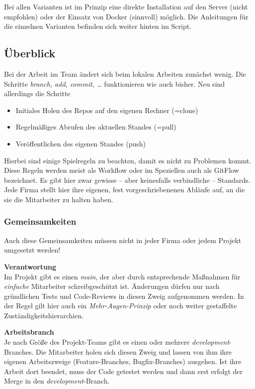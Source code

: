 \documentclass[
  letterpaper,
  DIV=11]{scrreprt}
\providecommand{\tightlist}{%
  \setlength{\itemsep}{0pt}\setlength{\parskip}{0pt}}\usepackage{longtable,booktabs,array}
\newcommand{\branch}[1]{\textit{#1}\xspace}
\begin{document}
Bei allen Varianten ist im Prinzip eine direkte Installation auf den
Server (nicht empfohlen) oder der Einsatz von Docker (sinnvoll) möglich.
Die Anleitungen für die einzelnen Varianten befinden sich weiter hinten
im Script.

\subsection{Überblick}\label{uxfcberblick}

Bei der Arbeit im Team ändert sich beim lokalen Arbeiten zunächst wenig.
Die Schritte \emph{branch, add, commit, \ldots{}} funktionieren wie auch
bisher. Neu sind allerdings die Schritte

\begin{itemize}
\tightlist
\item
  Initiales Holen des Repos auf den eigenen Rechner (=clone)
\item
  Regelmäßiges Abrufen des aktuellen Standes (=pull)
\item
  Veröffentlichen des eigenen Standes (push)
\end{itemize}

Hierbei sind einige Spielregeln zu beachten, damit es nicht zu Problemen
kommt. Diese Regeln werden meist als Workflow oder im Speziellen auch
als GitFlow bezeichnet. Es gibt hier zwar gewisse -- aber keinesfalls
verbindliche -- Standards. Jede Firma stellt hier ihre eigenen, fest
vorgeschriebenenen Abläufe auf, an die sie die Mitarbeiter zu halten
haben.

\subsubsection{Gemeinsamkeiten}\label{gemeinsamkeiten}

Auch diese Gemeinsamkeiten müssen nicht in jeder Firma oder jedem
Projekt umgesetzt werden!

\textbf{Verantwortung}\\
Im Projekt gibt es einen \branch{main}, der aber durch entsprechende
Maßnahmen für \emph{einfache} Mitarbeiter schreibgeschützt ist.
Änderungen dürfen nur nach gründlichen Tests und Code-Reviews in diesen
Zweig aufgenommen werden. In der Regel gilt hier auch ein
\emph{Mehr-Augen-Prinzip} oder noch weiter gestaffelte
Zuständigkeitshierarchien.

\textbf{Arbeitsbranch}\\
Je nach Größe des Projekt-Teams gibt es einen oder mehrere
\branch{development}-Branches. Die Mitarbeiter holen sich diesen Zweig
und lassen von ihm ihre eigenen Arbeitszweige (Feature-Branches,
Bugfix-Branches) ausgehen. Ist ihre Arbeit dort beendet, muss der Code
getestet werden und dann erst erfolgt der Merge in den
\branch{development}-Branch.
\end{document}

